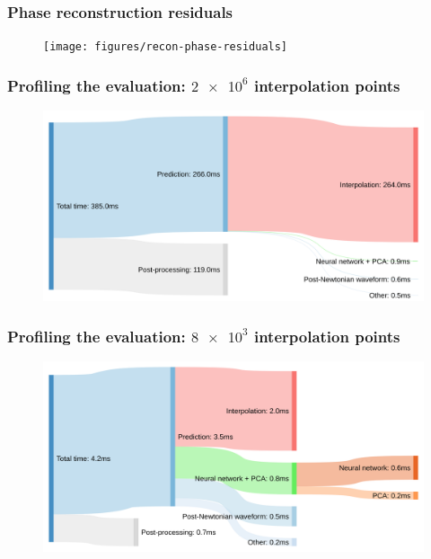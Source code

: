\documentclass{beamer}
\begin{document}
\begin{frame}
    \frametitle{Phase reconstruction residuals}
    \begin{figure}[ht]
    \centering
    \texttt{[image: figures/recon-phase-residuals]}
    \label{fig:recon-phase-residuals}
    \end{figure}
\end{frame}

\begin{frame}
    \frametitle{Profiling the evaluation: \(\num{2e6}\) interpolation points}
    \begin{figure}[ht]
    \centering
    \includegraphics[width=\textwidth]{figures/sankey_full}
    \label{fig:sankey_full}
    \end{figure}
\end{frame}

\begin{frame}
    \frametitle{Profiling the evaluation: \(\num{8e3}\) interpolation points}
    \begin{figure}[ht]
    \centering
    \includegraphics[width=\textwidth]{figures/sankey_downsampled}
    \label{fig:sankey_downsampled}
    \end{figure}
\end{frame}
\end{document}
